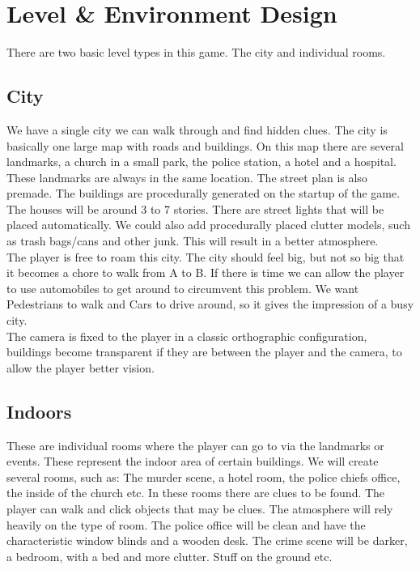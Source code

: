 \documentclass{article}
\begin{document}
\section{Level \& Environment Design}
	There are two basic level types in this game. The city and individual rooms.
	\subsection{City}
		We have a single city we can walk through and find hidden clues. The city is basically one large map with roads and buildings. On this map there are several landmarks, a church in a small park, the police station, a hotel and a hospital. These landmarks are always in the same location. The street plan is also premade. The buildings are procedurally generated on the startup of the game. The houses will be around 3 to 7 stories. There are street lights that will be placed automatically. We could also add procedurally placed clutter models, such as trash bags/cans and other junk. This will result in a better atmosphere.\\
		The player is free to roam this city. The city should feel big, but not so big that it becomes a chore to walk from A to B. If there is time we can allow the player to use automobiles to get around to circumvent this problem. We want Pedestrians to walk and Cars to drive around, so it gives the impression of a busy city.\\
		The camera is fixed to the player in a classic orthographic configuration, buildings become transparent if they are between the player and the camera, to allow the player better vision.
	\subsection{Indoors}
		These are individual rooms where the player can go to via the landmarks or events. These represent the indoor area of certain buildings. We will create several rooms, such as: The murder scene, a hotel room, the police chiefs office, the inside of the church etc. In these rooms there are clues to be found. The player can walk and click objects that may be clues. The atmosphere will rely heavily on the type of room. The police office will be clean and have the characteristic window blinds and a wooden desk. The crime scene will be darker, a bedroom, with a bed and more clutter. Stuff on the ground etc.
\end{document}

